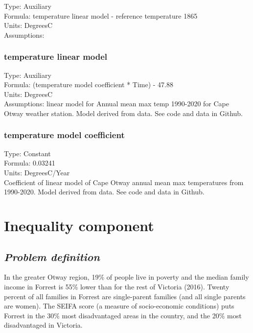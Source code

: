 \documentclass[
  11pt,
]{book}
\begin{document}
Type: Auxiliary\\
Formula: temperature linear model - reference temperature 1865\\
Units: DegreesC\\
Assumptions:

\hypertarget{temperature-linear-model}{%
\subsection{temperature linear model}\label{temperature-linear-model}}

Type: Auxiliary\\
Formula: (temperature model coefficient * Time) - 47.88\\
Units: DegreesC\\
Assumptions: linear model for Annual mean max temp 1990-2020 for Cape Otway weather station. Model derived from data. See code and data in Github.

\hypertarget{temperature-model-coefficient}{%
\subsection{temperature model coefficient}\label{temperature-model-coefficient}}

Type: Constant\\
Formula: 0.03241\\
Units: DegreesC/Year\\
Coefficient of linear model of Cape Otway annual mean max temperatures from 1990-2020. Model derived from data. See code and data in Github.

\hypertarget{inequality-component}{%
\chapter{Inequality component}\label{inequality-component}}

\hypertarget{problem-definition-7}{%
\section{\texorpdfstring{\emph{Problem definition}}{Problem definition}}\label{problem-definition-7}}

In the greater Otway region, 19\% of people live in poverty and the median family income in Forrest is 55\% lower than for the rest of Victoria (2016). Twenty percent of all families in Forrest are single-parent families (and all single parents are women). The SEIFA score (a measure of socio-economic conditions) puts Forrest in the 30\% most disadvantaged areas in the country, and the 20\% most disadvantaged in Victoria.
\end{document}
